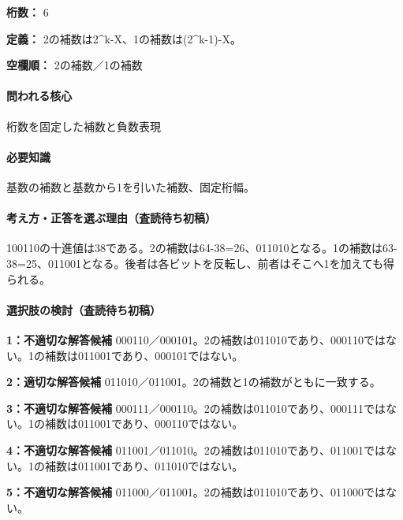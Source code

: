 \noindent\textbf{桁数：} 6\par

\noindent\textbf{定義：} 2の補数は2\textasciicircum{}k-X、1の補数は(2\textasciicircum{}k-1)-X。\par

\noindent\textbf{空欄順：} 2の補数／1の補数\par

\paragraph{問われる核心} 桁数を固定した補数と負数表現

\paragraph{必要知識} 基数の補数と基数から1を引いた補数、固定桁幅。

\paragraph{考え方・正答を選ぶ理由（査読待ち初稿）} 100110の十進値は38である。2の補数は64-38=\allowbreak{}26、011010となる。1の補数は63-38=\allowbreak{}25、011001となる。後者は各ビットを反転し、前者はそこへ1を加えても得られる。

\paragraph{選択肢の検討（査読待ち初稿）}\mbox{}\par

\noindent\textbf{1：不適切な解答候補} 000110／000101。2の補数は011010であり、000110ではない。1の補数は011001であり、000101ではない。\par

\noindent\textbf{2：適切な解答候補} 011010／011001。2の補数と1の補数がともに一致する。\par

\noindent\textbf{3：不適切な解答候補} 000111／000110。2の補数は011010であり、000111ではない。1の補数は011001であり、000110ではない。\par

\noindent\textbf{4：不適切な解答候補} 011001／011010。2の補数は011010であり、011001ではない。1の補数は011001であり、011010ではない。\par

\noindent\textbf{5：不適切な解答候補} 011000／011001。2の補数は011010であり、011000ではない。\par

